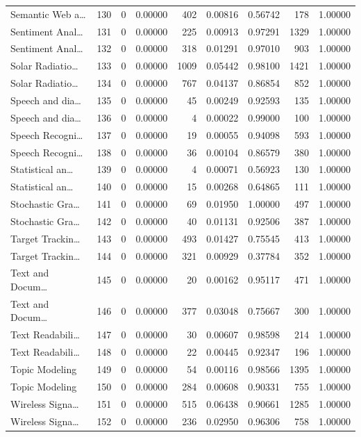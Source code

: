 \begin{table}
\begin{tabular}{lrrrrrrrr}
Semantic Web a… & 130 & 0 & 0.00000 & 402 & 0.00816 & 0.56742 & 178 & 1.00000 \\
Sentiment Anal… & 131 & 0 & 0.00000 & 225 & 0.00913 & 0.97291 & 1329 & 1.00000 \\
Sentiment Anal… & 132 & 0 & 0.00000 & 318 & 0.01291 & 0.97010 & 903 & 1.00000 \\
Solar Radiatio… & 133 & 0 & 0.00000 & 1009 & 0.05442 & 0.98100 & 1421 & 1.00000 \\
Solar Radiatio… & 134 & 0 & 0.00000 & 767 & 0.04137 & 0.86854 & 852 & 1.00000 \\
Speech and dia… & 135 & 0 & 0.00000 & 45 & 0.00249 & 0.92593 & 135 & 1.00000 \\
Speech and dia… & 136 & 0 & 0.00000 & 4 & 0.00022 & 0.99000 & 100 & 1.00000 \\
Speech Recogni… & 137 & 0 & 0.00000 & 19 & 0.00055 & 0.94098 & 593 & 1.00000 \\
Speech Recogni… & 138 & 0 & 0.00000 & 36 & 0.00104 & 0.86579 & 380 & 1.00000 \\
Statistical an… & 139 & 0 & 0.00000 & 4 & 0.00071 & 0.56923 & 130 & 1.00000 \\
Statistical an… & 140 & 0 & 0.00000 & 15 & 0.00268 & 0.64865 & 111 & 1.00000 \\
Stochastic Gra… & 141 & 0 & 0.00000 & 69 & 0.01950 & 1.00000 & 497 & 1.00000 \\
Stochastic Gra… & 142 & 0 & 0.00000 & 40 & 0.01131 & 0.92506 & 387 & 1.00000 \\
Target Trackin… & 143 & 0 & 0.00000 & 493 & 0.01427 & 0.75545 & 413 & 1.00000 \\
Target Trackin… & 144 & 0 & 0.00000 & 321 & 0.00929 & 0.37784 & 352 & 1.00000 \\
Text and Docum… & 145 & 0 & 0.00000 & 20 & 0.00162 & 0.95117 & 471 & 1.00000 \\
Text and Docum… & 146 & 0 & 0.00000 & 377 & 0.03048 & 0.75667 & 300 & 1.00000 \\
Text Readabili… & 147 & 0 & 0.00000 & 30 & 0.00607 & 0.98598 & 214 & 1.00000 \\
Text Readabili… & 148 & 0 & 0.00000 & 22 & 0.00445 & 0.92347 & 196 & 1.00000 \\
Topic Modeling & 149 & 0 & 0.00000 & 54 & 0.00116 & 0.98566 & 1395 & 1.00000 \\
Topic Modeling & 150 & 0 & 0.00000 & 284 & 0.00608 & 0.90331 & 755 & 1.00000 \\
Wireless Signa… & 151 & 0 & 0.00000 & 515 & 0.06438 & 0.90661 & 1285 & 1.00000 \\
Wireless Signa… & 152 & 0 & 0.00000 & 236 & 0.02950 & 0.96306 & 758 & 1.00000 \\
\bottomrule
\end{tabular}
\end{table}
